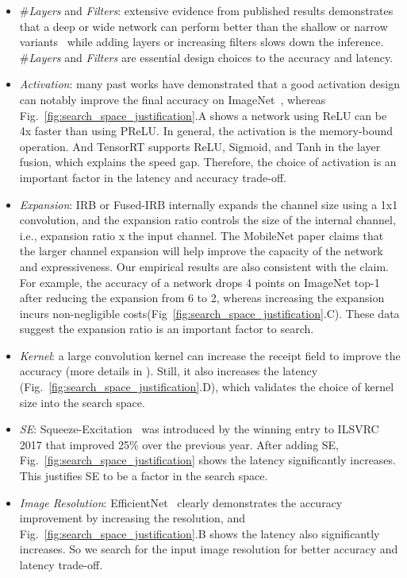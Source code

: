 \documentclass[10pt,twocolumn,letterpaper]{article}
\begin{document}
\begin{itemize}
  \item \#\textit{Layers} and \textit{Filters}: extensive evidence from published results demonstrates that a deep or wide network can perform better than the shallow or narrow variants~\cite{he2016deep, lu2017expressive} while adding layers or increasing filters slows down the inference. \#\textit{Layers} and \textit{Filters} are essential design choices to the accuracy and latency.
  \item \textit{Activation}: many past works have demonstrated that a good activation design can notably improve the final accuracy on ImageNet~\cite{he2015delving, ramachandran2017searching}, whereas Fig.~\ref{fig:search_space_justification}.A shows a network using ReLU can be 4x faster than using PReLU. In general, the activation is the memory-bound operation. And TensorRT supports ReLU, Sigmoid, and Tanh in the layer fusion, which explains the speed gap. Therefore, the choice of activation is an important factor in the latency and accuracy trade-off.
  \item \textit{Expansion}: IRB or Fused-IRB internally expands the channel size using a 1x1 convolution, and the expansion ratio controls the size of the internal channel, i.e., expansion ratio x the input channel. The MobileNet \cite{sandler2018mobilenetv2} paper claims that the larger channel expansion will help improve the capacity of the network and expressiveness. Our empirical results are also consistent with the claim. For example, the accuracy of a network drops 4 points on ImageNet top-1 after reducing the expansion from 6 to 2, whereas increasing the expansion incurs non-negligible costs(Fig~\ref{fig:search_space_justification}.C). These data suggest the expansion ratio is an important factor to search.
  \item \textit{Kernel}: a large convolution kernel can increase the receipt field to improve the accuracy (more details in \cite{araujo2019computing}). Still, it also increases the latency (Fig.~\ref{fig:search_space_justification}.D), which validates the choice of kernel size into the search space. 
  \item \textit{SE}: Squeeze-Excitation~\cite{hu2018squeeze} was introduced by the winning entry to ILSVRC 2017 that improved 25\% over the previous year. After adding SE, Fig.~\ref{fig:search_space_justification} shows the latency significantly increases. This justifies SE to be a factor in the search space.
  \item \textit{Image Resolution}: EfficientNet~\cite{tan2019efficientnet} clearly demonstrates the accuracy improvement by increasing the resolution, and Fig.~\ref{fig:search_space_justification}.B shows the latency also significantly increases. So we search for the input image resolution for better accuracy and latency trade-off.
\end{itemize}
\end{document}
